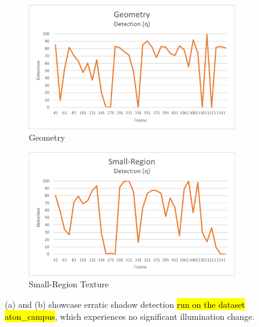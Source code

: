 \begin{figure}
\centering
\begin{subfigure}{.8\linewidth}
  \includegraphics[width=1\linewidth]{figures/campus_geo_erratic.jpg}
  \caption{Geometry}
\end{subfigure}
\hfill
\begin{subfigure}{.8\linewidth}
  \includegraphics[width=1\linewidth]{figures/campus_srt_erratic.jpg}
  \caption{Small-Region Texture}
\end{subfigure}

\caption{(a) and (b) showcase erratic shadow detection \hl{run on the dataset aton\_campus}, which experiences no significant illumination change.}
\label{fig:geosrterratic}
\end{figure}

